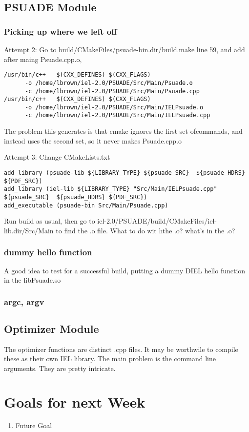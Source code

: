 \subsection{PSUADE Module}

\subsubsection{Picking up where we left off}

Attempt 2: Go to build/CMakeFiles/psuade-bin.dir/build.make line 59, and add after maing Psuade.cpp.o,

	
\begin{verbatim}
/usr/bin/c++   $(CXX_DEFINES) $(CXX_FLAGS)
      -o /home/lbrown/iel-2.0/PSUADE/Src/Main/Psuade.o
      -c /home/lbrown/iel-2.0/PSUADE/Src/Main/Psuade.cpp
/usr/bin/c++   $(CXX_DEFINES) $(CXX_FLAGS)
      -o /home/lbrown/iel-2.0/PSUADE/Src/Main/IELPsuade.o 
      -c /home/lbrown/iel-2.0/PSUADE/Src/Main/IELPsuade.cpp
\end{verbatim}

The problem this generates is that cmake ignores the first set ofcommands, and instead uses the second set, so it never makes Psuade.cpp.o


Attempt 3: Change CMakeLists.txt
\begin{verbatim}
add_library (psuade-lib ${LIBRARY_TYPE} ${psuade_SRC}  ${psuade_HDRS} ${PDF_SRC})
add_library (iel-lib ${LIBRARY_TYPE} "Src/Main/IELPsuade.cpp" ${psuade_SRC}  ${psuade_HDRS} ${PDF_SRC})
add_executable (psuade-bin Src/Main/Psuade.cpp)
\end{verbatim}

Run build as usual, then go to iel-2.0/PSUADE/build/CMakeFiles/iel-lib.dir/Src/Main to find the .o file. What to do wit hthe .o? what's in the .o?

\subsubsection{dummy hello function}
A good idea to test for a successful build, putting a dummy DIEL hello function in the libPsuade.so

\subsubsection{argc, argv}

\subsection{Optimizer Module}
The optimizer functions are distinct .cpp files. It may be worthwile to compile these as their own IEL library. The main problem is the command line arguments. They are pretty intricate. 


\section{Goals for next Week}
\begin{enumerate}
\item Future Goal
\end{enumerate}


